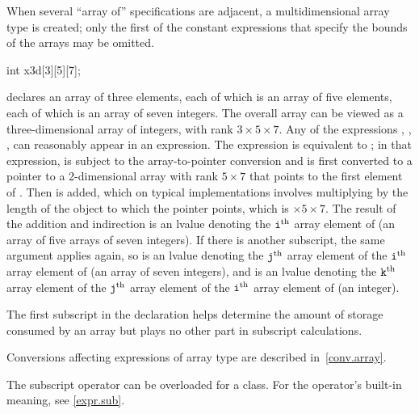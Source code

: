 \pnum
{}%
\begin{note}
When several ``array of'' specifications are adjacent,
a multidimensional array type is created;
only the first of the constant expressions
that specify the bounds of the arrays may be omitted.
\begin{example}
\begin{codeblock}
int x3d[3][5][7];
\end{codeblock}
declares an array of three elements,
each of which is an array of five elements,
each of which is an array of seven integers.
The overall array can be viewed as a
three-dimensional array of integers,
with rank $3 \times 5 \times 7$.
Any of the expressions
,
,
,
can reasonably appear in an expression.
The expression
is equivalent to
;
in that expression,
is subject to the array-to-pointer conversion
and is first converted to
a pointer to a 2-dimensional
array with rank
$5 \times 7$
that points to the first element of .
Then  is added,
which on typical implementations involves multiplying
 by the
length of the object to which the pointer points,
which is $ \times 5 \times 7$.
The result of the addition and indirection is
an lvalue denoting
the $\texttt{i}^\text{th}$ array element of
(an array of five arrays of seven integers).
If there is another subscript,
the same argument applies again, so
 is
an lvalue denoting
the $\texttt{j}^\text{th}$ array element of
the $\texttt{i}^\text{th}$ array element of
(an array of seven integers), and
 is
an lvalue denoting
the $\texttt{k}^\text{th}$ array element of
the $\texttt{j}^\text{th}$ array element of
the $\texttt{i}^\text{th}$ array element of
(an integer).
\end{example}
The first subscript in the declaration helps determine
the amount of storage consumed by an array
but plays no other part in subscript calculations.
\end{note}

\pnum
\begin{note}
Conversions affecting expressions of array type are described in~\ref{conv.array}.
\end{note}

\pnum
\begin{note}
The subscript operator can be overloaded for a class.
For the operator's built-in meaning, see \ref{expr.sub}.
\end{note}

